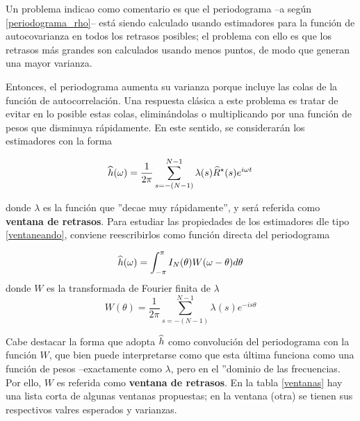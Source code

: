Un problema indicao como comentario es que el periodograma --a seg\'un \ref{periodograma_rho}--
est\'a siendo calculado usando estimadores para la funci\'on de autocovarianza en todos los 
retrasos posibles; el problema con ello es que los retrasos m\'as grandes son calculados usando
menos puntos, de modo que generan una mayor varianza.

Entonces, el periodograma aumenta su varianza porque incluye las colas de la funci\'on de
autocorrelaci\'on. Una respuesta cl\'asica a este problema es tratar de evitar en lo posible estas
colas, elimin\'andolas o multiplicando por una funci\'on de pesos que disminuya r\'apidamente.
En este sentido, se considerar\'an los estimadores con la forma


\begin{equation}
\widehat{ h }(\omega) = \frac{1}{2\pi} \sum_{s = -(N-1)}^{N-1} 
\lambda(s) \widehat{ R }^{\star}(s) e^{i \omega t}
\label{ventaneando}
\end{equation}

donde $\lambda$ es la funci\'on que ''decae muy r\'apidamente'', y ser\'a referida como
\textbf{ventana de retrasos}. Para estudiar las propiedades de los estimadores
dle tipo \ref{ventaneando}, conviene reescribirlos como funci\'on directa del periodograma

\begin{equation*}
\widehat{ h }(\omega) = \int_{-\pi}^{\pi} I_N(\theta) W(\omega-\theta) d\theta
\end{equation*}
donde $W$ es la transformada de Fourier finita de $\lambda$
\begin{equation*}
W(\theta) = \frac{1}{2\pi} \sum_{s = -(N-1)}^{N-1} \lambda(s) e^{-is\theta}
\end{equation*}

Cabe destacar la forma que adopta $\widehat{ h }$ como convoluci\'on del periodograma con la funci\'on
$W$, que bien puede interpretarse como que esta \'ultima funciona como una funci\'on de pesos
--exactamente como $\lambda$, pero en el ''dominio de las frecuencias. Por ello, $W$ es
referida como \textbf{ventana de retrasos}.
En la tabla \ref{ventanas} hay una lista corta de algunas ventanas propuestas; en la ventana
(otra) se tienen sus respectivos valres esperados y varianzas.

